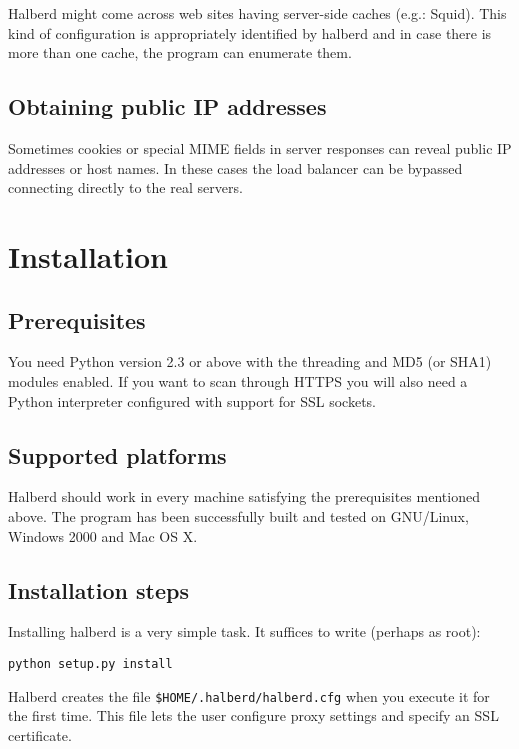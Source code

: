 \documentclass[a4paper]{book}
\begin{document}
Halberd might come across web sites having server-side caches (e.g.: Squid).
This kind of configuration is appropriately identified by halberd and in case
there is more than one cache, the program can enumerate them.

\section{Obtaining public IP addresses}

Sometimes cookies or special MIME fields in server responses can reveal public
IP addresses or host names. In these cases the load balancer can be bypassed
connecting directly to the real servers.

\chapter{Installation}

\section{Prerequisites}

You need Python version 2.3 or above with the threading and MD5 (or SHA1)
modules enabled.  If you want to scan through HTTPS you will also need a Python
interpreter configured with support for SSL sockets.

\section{Supported platforms}

Halberd should work in every machine satisfying the prerequisites mentioned
above.  The program has been successfully built and tested on GNU/Linux, Windows
2000 and Mac OS X.

\section{Installation steps}

Installing halberd is a very simple task.  It suffices to write (perhaps as
root):

\begin{verbatim}
python setup.py install
\end{verbatim}

Halberd creates the file \verb|$HOME/.halberd/halberd.cfg| when you execute it
for the first time.  This file lets the user configure proxy settings and
specify an SSL certificate.
\end{document}
